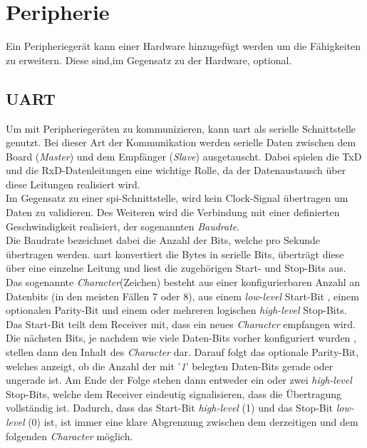  \section{Peripherie}\label{kap:peripherie}
 Ein Peripheriegerät kann einer Hardware hinzugefügt werden um die Fähigkeiten zu erweitern. Diese sind,im Gegensatz zu der Hardware, optional.

\subsection{UART}\label{kap:uart}

Um mit Peripheriegeräten zu kommunizieren, kann \ac{uart} als serielle Schnittstelle genutzt.
Bei dieser Art der Kommunikation werden serielle Daten zwischen dem Board (\emph{Master})
und dem Empfänger (\emph{Slave}) ausgetauscht. Dabei spielen die TxD und die RxD-Datenleitungen
eine wichtige Rolle, da der Datenaustausch über diese Leitungen realisiert wird.\\
Im Gegensatz zu einer \ac{spi}-Schnittstelle, wird kein Clock-Signal
übertragen um Daten zu validieren. Des Weiteren wird die Verbindung mit einer definierten
Geschwindigkeit realisiert, der sogenannten \emph{Baudrate}. \cite{uartpdf} \\
Die Baudrate bezeichnet dabei die Anzahl der Bits, welche pro Sekunde übertragen werden.
\ac{uart} konvertiert die Bytes in serielle Bits, überträgt diese über eine einzelne Leitung
und liest die zugehörigen Start- und Stop-Bits aus.\\
Das sogenannte \emph{Character}(Zeichen) besteht aus einer konfigurierbaren Anzahl an Datenbits (in den meisten
Fällen 7 oder 8), aus einem \emph{low-level} Start-Bit , einem optionalen Parity-Bit und einem
oder mehreren logischen \emph{high-level} Stop-Bits.\\
Das Start-Bit teilt dem Receiver mit, dass ein neues \emph{Character} empfangen wird.
Die nächsten Bits, je nachdem wie viele Daten-Bits vorher konfiguriert wurden , stellen
dann den Inhalt des \emph{Character} dar. Darauf folgt das optionale Parity-Bit,
welches anzeigt, ob die Anzahl der mit '\emph{1}' belegten Daten-Bits gerade oder
ungerade ist. Am Ende der Folge stehen dann entweder ein oder zwei  \emph{high-level } Stop-Bits,
welche dem Receiver eindeutig signalisieren, dass die Übertragung vollständig ist. Dadurch,
dass das Start-Bit \emph{high-level} (1) und das Stop-Bit \emph{low-level} (0) ist,
ist immer eine klare Abgrenzung zwischen dem derzeitigen und dem folgenden \emph{Character} möglich.\\

